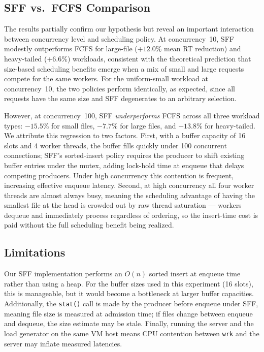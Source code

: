 \documentclass[conference]{IEEEtran}
\begin{document}
\subsection{SFF vs.\ FCFS Comparison}

The results partially confirm our hypothesis but reveal an important
interaction between concurrency level and scheduling policy. At
concurrency~10, SFF modestly outperforms FCFS for large-file
($+12.0\%$ mean RT reduction) and heavy-tailed ($+6.6\%$) workloads,
consistent with the theoretical prediction that size-based scheduling
benefits emerge when a mix of small and large requests compete for the
same workers. For the uniform-small workload at concurrency~10, the two
policies perform identically, as expected, since all requests have the
same size and SFF degenerates to an arbitrary selection.

However, at concurrency~100, SFF \emph{underperforms} FCFS across all
three workload types: $-15.5\%$ for small files, $-7.7\%$ for large
files, and $-13.8\%$ for heavy-tailed. We attribute this regression to
two factors. First, with a buffer capacity of 16 slots and 4 worker
threads, the buffer fills quickly under 100 concurrent connections;
SFF's sorted-insert policy requires the producer to shift existing
buffer entries under the mutex, adding lock-hold time at enqueue that
delays competing producers. Under high concurrency this contention is
frequent, increasing effective enqueue latency. Second, at high
concurrency all four worker threads are almost always busy, meaning the
scheduling advantage of having the smallest file at the head is crowded
out by raw thread saturation --- workers dequeue and immediately process
regardless of ordering, so the insert-time cost is paid without the
full scheduling benefit being realized.

\subsection{Limitations}

Our SFF implementation performs an $O(n)$ sorted insert at enqueue time
rather than using a heap. For the buffer sizes used in this experiment
(16 slots), this is manageable, but it would become a bottleneck at
larger buffer capacities. Additionally, the \texttt{stat()} call is made
by the producer before enqueue under SFF, meaning file size is measured
at admission time; if files change between enqueue and dequeue, the size
estimate may be stale. Finally, running the server and the load generator
on the same VM host means CPU contention between \texttt{wrk} and the
server may inflate measured latencies.
\end{document}
